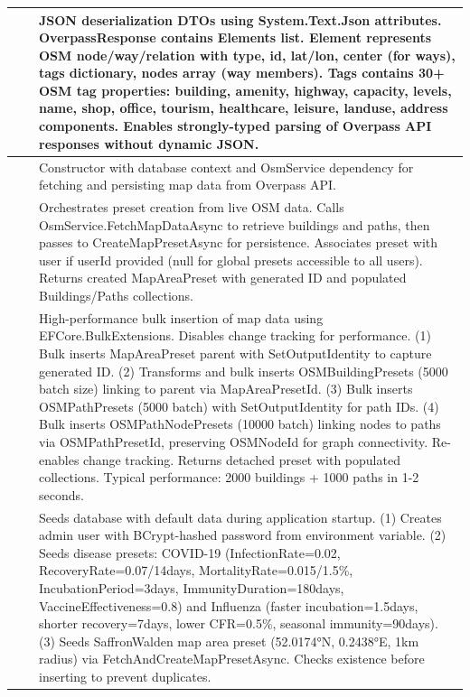 \begin{longtable}{|L{4cm}|L{4cm}|L{6cm}|}
&  & 
JSON deserialization DTOs using System.Text.Json attributes. OverpassResponse contains Elements list. Element represents OSM node/way/relation with type, id, lat/lon, center (for ways), tags dictionary, nodes array (way members). Tags contains 30+ OSM tag properties: building, amenity, highway, capacity, levels, name, shop, office, tourism, healthcare, leisure, landuse, address components. Enables strongly-typed parsing of Overpass API responses without dynamic JSON. \\
\hline

 & 
 & 
Constructor with database context and OsmService dependency for fetching and persisting map data from Overpass API. \\
&  & 
Orchestrates preset creation from live OSM data. Calls OsmService.FetchMapDataAsync to retrieve buildings and paths, then passes to CreateMapPresetAsync for persistence. Associates preset with user if userId provided (null for global presets accessible to all users). Returns created MapAreaPreset with generated ID and populated Buildings/Paths collections. \\
&  & 
High-performance bulk insertion of map data using EFCore.BulkExtensions. Disables change tracking for performance. (1) Bulk inserts MapAreaPreset parent with SetOutputIdentity to capture generated ID. (2) Transforms and bulk inserts OSMBuildingPresets (5000 batch size) linking to parent via MapAreaPresetId. (3) Bulk inserts OSMPathPresets (5000 batch) with SetOutputIdentity for path IDs. (4) Bulk inserts OSMPathNodePresets (10000 batch) linking nodes to paths via OSMPathPresetId, preserving OSMNodeId for graph connectivity. Re-enables change tracking. Returns detached preset with populated collections. Typical performance: 2000 buildings + 1000 paths in 1-2 seconds. \\
&  & 
Seeds database with default data during application startup. (1) Creates admin user with BCrypt-hashed password from environment variable. (2) Seeds disease presets: COVID-19 (InfectionRate=0.02, RecoveryRate=0.07/14days, MortalityRate=0.015/1.5\%, IncubationPeriod=3days, ImmunityDuration=180days, VaccineEffectiveness=0.8) and Influenza (faster incubation=1.5days, shorter recovery=7days, lower CFR=0.5\%, seasonal immunity=90days). (3) Seeds SaffronWalden map area preset (52.0174°N, 0.2438°E, 1km radius) via FetchAndCreateMapPresetAsync. Checks existence before inserting to prevent duplicates. \\
\hline


\end{longtable}
